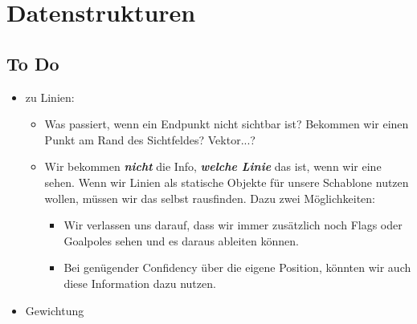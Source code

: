 \section*{Datenstrukturen}
\subsection*{To Do}
\begin{itemize}
\item  zu Linien:
\begin{itemize}
	\item  Was passiert, wenn ein Endpunkt nicht sichtbar ist? Bekommen wir einen Punkt am Rand des Sichtfeldes? Vektor...?
	\item  Wir bekommen \textit{\textbf{nicht}} die Info, \textit{\textbf{welche Linie}}
 das ist, wenn wir eine sehen. Wenn wir Linien als statische Objekte für
 unsere Schablone nutzen wollen, müssen wir das selbst rausfinden. Dazu 
zwei Möglichkeiten:
	\begin{itemize}
		\item  Wir verlassen uns darauf, dass wir immer zusätzlich noch Flags oder Goalpoles sehen und es daraus ableiten können.
		\item  Bei genügender Confidency über die eigene Position, könnten wir auch diese Information dazu nutzen.
	\end{itemize}
\end{itemize}
\item Gewichtung
\end{itemize}
